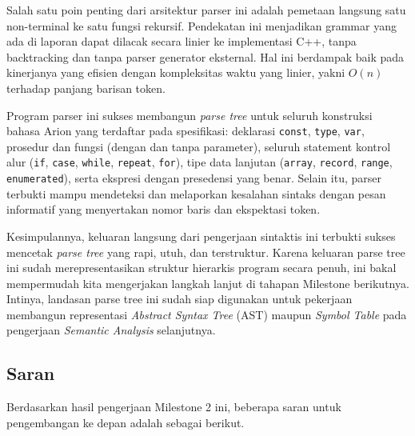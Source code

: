\documentclass[11pt,a4paper]{article}
\begin{document}
Salah satu poin penting dari arsitektur parser ini adalah pemetaan langsung satu
non-terminal ke satu fungsi rekursif. Pendekatan ini menjadikan grammar
yang ada di laporan dapat dilacak secara linier ke implementasi C++, tanpa
backtracking dan tanpa parser generator eksternal. Hal ini berdampak baik pada
kinerjanya yang efisien dengan kompleksitas waktu yang linier, yakni $O(n)$
terhadap panjang barisan token.

Program parser ini sukses membangun \textit{parse tree} untuk seluruh konstruksi
bahasa Arion yang terdaftar pada spesifikasi: deklarasi \texttt{const},
\texttt{type}, \texttt{var}, prosedur dan fungsi (dengan dan tanpa parameter),
seluruh statement kontrol alur (\texttt{if}, \texttt{case}, \texttt{while},
\texttt{repeat}, \texttt{for}), tipe data lanjutan (\texttt{array},
\texttt{record}, \texttt{range}, \texttt{enumerated}), serta ekspresi dengan
presedensi yang benar. Selain itu, parser terbukti mampu mendeteksi dan
melaporkan kesalahan sintaks dengan pesan informatif yang menyertakan nomor
baris dan ekspektasi token.

Kesimpulannya, keluaran langsung dari pengerjaan sintaktis ini terbukti sukses
mencetak \textit{parse tree} yang rapi, utuh, dan terstruktur. Karena keluaran
parse tree ini sudah merepresentasikan struktur hierarkis program secara penuh,
ini bakal mempermudah kita mengerjakan langkah lanjut di tahapan Milestone
berikutnya. Intinya, landasan parse tree ini sudah siap digunakan untuk
pekerjaan membangun representasi \textit{Abstract Syntax Tree} (AST) maupun
\textit{Symbol Table} pada pengerjaan \textit{Semantic Analysis} selanjutnya.

\subsection{Saran}

Berdasarkan hasil pengerjaan Milestone 2 ini, beberapa saran untuk pengembangan ke depan adalah sebagai berikut.
\end{document}
